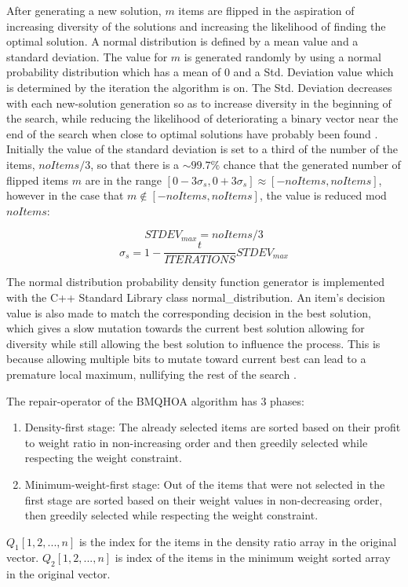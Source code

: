 \documentclass[titlepage]{article}
\begin{document}
After generating a new solution, $m$ items are flipped in the aspiration of increasing diversity of the solutions and increasing the likelihood of finding the optimal solution. A normal distribution is defined by a mean value and a standard deviation. The value for $m$ is generated randomly by using a normal probability distribution which has a mean of $0$ and a Std. Deviation value which is determined by the iteration the algorithm is on. The Std. Deviation decreases with each new-solution generation so as to increase diversity in the beginning of the search, while reducing the likelihood of deteriorating a binary vector near the end of the search when close to optimal solutions have probably been found \cite{BMQHOA-article}. Initially the value of the standard deviation is set to a third of the number of the items, $noItems/3$, so that there is a $\sim 99.7\%$ chance that the generated number of flipped items $m$ are in the range $[0-3\sigma_{s}, 0+3\sigma_{s}] \approx [-noItems, noItems]$, however in the case that $m \notin [-noItems, noItems]$, the value is reduced mod $noItems$:

$$STDEV_{max} = noItems/3$$
$$\sigma_{s} = 1-\frac{t}{ITERATIONS} STDEV_{max}$$

The normal distribution probability density function generator is implemented with the C++ Standard Library class normal\_distribution. An item's decision value is also made to match the corresponding decision in the best solution, which gives a slow mutation towards the current best solution allowing for diversity while still allowing the best solution to influence the process. This is because allowing multiple bits to mutate toward current best can lead to a premature local maximum, nullifying the rest of the search \cite{BMQHOA-article} . 

The repair-operator of the BMQHOA algorithm has 3 phases:
\begin{enumerate}
    \item Density-first stage: The already selected items are sorted based on their profit to weight ratio in non-increasing order and then greedily selected while respecting the weight constraint. 
    \item Minimum-weight-first stage: Out of the items that were not selected in the first stage are sorted based on their weight values in non-decreasing order, then greedily selected while respecting the weight constraint.   
\end{enumerate}

$Q_{1}[1, 2,...,n]$ is the index for the items in the density ratio array in the original vector. $Q_{2}[1, 2,..., n]$ is index of the items in the minimum weight sorted array in the original vector.
\end{document}

